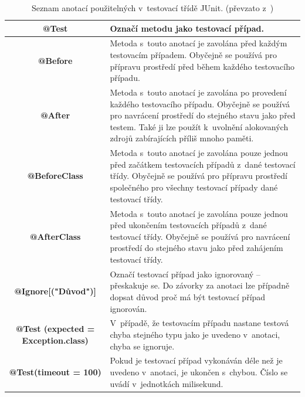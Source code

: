     \begin{table}
      \renewcommand{\tabularxcolumn}[1]{>{\small}m{#1}}
      \centering
      \begin{tabularx}{\textwidth}{|c|X|}
	\hline
	\textbf{@Test} & Označí metodu jako testovací případ.\\ \hline
	\textbf{@Before} & Metoda s~touto anotací je zavolána před každým testovacím případem. Obyčejně se používá pro přípravu prostředí před během každého testovacího případu.\\ \hline
	\textbf{@After} & Metoda s~touto anotací je zavolána po provedení každého testovacího případu. Obyčejně se používá pro navrácení prostředí do stejného stavu jako před testem. Také ji lze použít k~uvolnění alokovaných zdrojů zabírajících příliš mnoho paměti.\\ \hline
	\textbf{@BeforeClass} & Metoda s~touto anotací je zavolána pouze jednou před začátkem testovacích případů z~dané testovací třídy.  Obyčejně se používá pro přípravu prostředí společného pro všechny testovací případy dané testovací třídy.\\ \hline
	\textbf{@AfterClass} & Metoda s~touto anotací je zavolána pouze jednou před ukončením testovacích případů z~dané testovací třídy. Obyčejně se používá pro navrácení prostředí do stejného stavu jako před zahájením testovací třídy.\\ \hline
	\textbf{@Ignore[("Důvod")]} & Označí testovací případ jako ignorovaný -- přeskakuje se. Do závorky za anotaci lze případně dopsat důvod proč má být testovací případ ignorován.\\ \hline
	\textbf{@Test (expected = Exception.class)} & V~případě, že testovacím případu nastane testová chyba stejného typu jako je uvedeno v~anotaci, chyba se ignoruje.\\ \hline
	\textbf{@Test(timeout = 100)} & Pokud je testovací případ vykonáván déle než je uvedeno v~anotaci, je ukončen s~chybou. Číslo se uvádí v~jednotkách milisekund.\\
	\hline
      \end{tabularx}
      \label{tab:junit_annotations}
      \caption{Seznam anotací použitelných v~testovací třídě JUnit. (převzato z~\cite{vogella:JUnit})}
    \end{table}


